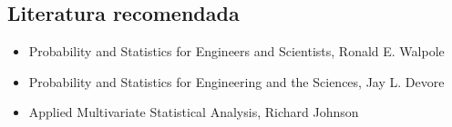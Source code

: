\documentclass{article}
\begin{document}
        \subsection{Literatura recomendada}

            \begin{itemize}
                \item Probability and Statistics for Engineers and Scientists, Ronald E. Walpole \cite{walpole1993probability}
                \item Probability and Statistics for Engineering and the Sciences, Jay L. Devore \cite{devore2011probability}
                \item Applied Multivariate Statistical Analysis, Richard Johnson \cite{johnson2014applied}
            \end{itemize}

    
    
\end{document}
